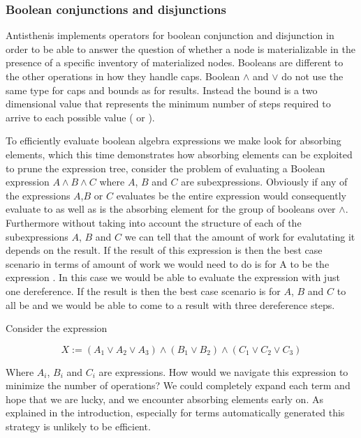 \subsubsection{Boolean conjunctions and disjunctions}

Antisthenis implements operators for boolean conjunction and
disjunction in order to be able to answer the question of whether a
node is materializable in the presence of a specific inventory of
materialized nodes. Booleans are different to the other operations in
how they handle caps. Boolean \(\land\) and \(\lor\) do not use the
same type for caps and bounds as for results. Instead the bound is a
two dimensional value that represents the minimum number of steps
required to arrive to each possible value ( or
).

To efficiently evaluate boolean algebra expressions we make look for
absorbing elements, which this time demonstrates how absorbing
elements can be exploited to prune the expression tree, consider the
problem of evaluating a Boolean expression \(A \land B \land C\) where
\(A\), \(B\) and \(C\) are subexpressions. Obviously if any of the
expressions \(A\),\(B\) or \(C\) evaluates be  the entire
expression would consequently evaluate to  as well as
 is the absorbing element for the group of booleans over
\(\land\). Furthermore without taking into account the structure of
each of the subexpressions \(A\), \(B\) and \(C\) we can tell that the
amount of work for evalutating it depends on the result. If the result
of this expression is  then the best case scenario in
terms of amount of work we would need to do is for A to be the
expression . In this case we would be able to evaluate the
expression with just one dereference. If the result is 
then the best case scenario is for \(A\), \(B\) and \(C\) to all be
 and we would be able to come to a result with three
dereference steps.

Consider the expression

\[
X := (A_1 \lor A_2 \lor A_3) \land (B_1 \lor B_2) \land (C_1 \lor C_2 \lor C_3)
\]

Where \(A_i\), \(B_i\) and \(C_i\) are expressions. How would we
navigate this expression to minimize the number of operations?  We
could completely expand each term and hope that we are lucky, and we
encounter absorbing elements early on. As explained in the
introduction, especially for terms automatically generated this
strategy is unlikely to be efficient.

